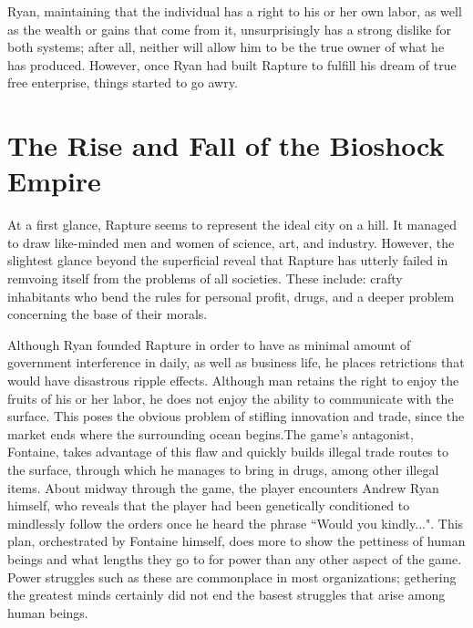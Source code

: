 \documentclass{article}
\begin{document}
Ryan, maintaining that the individual has a right to his or her own labor, as well as the wealth or gains that 
come from it, unsurprisingly has a strong dislike for both systems; after all, neither will allow him to 
be the true owner of what he has produced. However, once Ryan had built Rapture to fulfill his dream of 
true free enterprise, things started to go awry. 

\section{The Rise and Fall of the Bioshock Empire}
At a first glance, Rapture seems to represent the ideal city on a hill. It managed to draw like-minded men and
women of science, art, and industry. However, the slightest glance beyond the superficial reveal that Rapture
has utterly failed in remvoing itself from the problems of all societies. These include: crafty inhabitants
who bend the rules for personal profit, drugs, and a deeper problem concerning the base of their morals. 

Although Ryan founded Rapture in order to have as minimal amount of government interference in daily, as well 
as business life, he places retrictions that would have disastrous ripple effects.  Although man retains
the right to enjoy the fruits of his or her labor, he does not enjoy the ability to communicate with the 
surface. This poses the obvious problem of stifling innovation and trade, since the market ends where the 
surrounding ocean begins.The game's antagonist, Fontaine, takes advantage of this flaw and quickly builds 
illegal trade routes to the
surface, through which he manages to bring in drugs, among other illegal items. About midway through the game,
the player encounters  Andrew Ryan himself, who reveals that the player had been genetically conditioned to
mindlessly follow the orders once he heard the phrase ``Would you kindly...". This plan, orchestrated by 
Fontaine himself, does more to show the pettiness of human beings and what lengths they go to for power than 
any other aspect of the game. Power struggles such as these are commonplace in most organizations; 
gethering the greatest minds certainly did not end the basest struggles that arise among human beings. 
\end{document}
